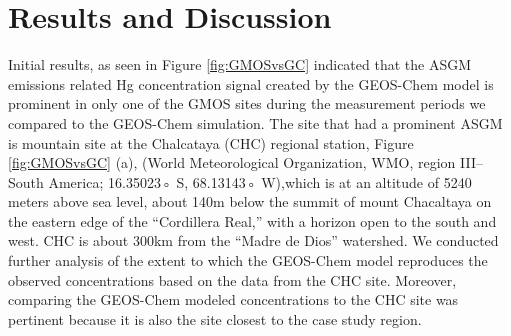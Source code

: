 \section{Results and Discussion}
\begin{flushleft}


Initial results, as seen in Figure \ref{fig:GMOSvsGC} indicated that the ASGM emissions related Hg concentration signal created by the GEOS-Chem model is prominent in only one of the GMOS sites during the measurement periods we compared to the GEOS-Chem simulation. The site that had a prominent ASGM  is mountain site at the Chalcataya (CHC) regional station, Figure \ref{fig:GMOSvsGC} (a), (World Meteorological Organization, WMO, region III-- South America; 16.35023◦ S, 68.13143◦ W),which is at an altitude of 5240 meters above sea level, about 140m below the summit of mount Chacaltaya on the eastern edge of the ``Cordillera Real,'' with a horizon open to the south and west. CHC is about 300km from the ``Madre de Dios'' watershed. We conducted further analysis of the extent to which the GEOS-Chem model reproduces the observed concentrations based on the data from the CHC site. Moreover, comparing the GEOS-Chem modeled concentrations to the CHC site was pertinent because it is also the site closest to the case study region. 
\end{flushleft}


                        





